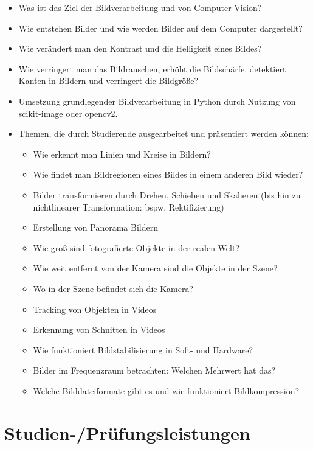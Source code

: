 \begin{itemize}
\tightlist
\item
  Was ist das Ziel der Bildverarbeitung und von Computer Vision?
\item
  Wie entstehen Bilder und wie werden Bilder auf dem Computer
  dargestellt?
\item
  Wie verändert man den Kontrast und die Helligkeit eines Bildes?
\item
  Wie verringert man das Bildrauschen, erhöht die Bildschärfe,
  detektiert Kanten in Bildern und verringert die Bildgröße?
\item
  Umsetzung grundlegender Bildverarbeitung in Python durch Nutzung von
  scikit-image oder opencv2.
\item
  Themen, die durch Studierende ausgearbeitet und präsentiert werden
  können:

  \begin{itemize}
\tightlist
\item
    Wie erkennt man Linien und Kreise in Bildern?
  \item
    Wie findet man Bildregionen eines Bildes in einem anderen Bild
    wieder?
  \item
    Bilder transformieren durch Drehen, Schieben und Skalieren (bis hin
    zu nichtlinearer Transformation: bspw. Rektifizierung)
  \item
    Erstellung von Panorama Bildern
  \item
    Wie groß sind fotografierte Objekte in der realen Welt?
  \item
    Wie weit entfernt von der Kamera sind die Objekte in der Szene?
  \item
    Wo in der Szene befindet sich die Kamera?
  \item
    Tracking von Objekten in Videos
  \item
    Erkennung von Schnitten in Videos
  \item
    Wie funktioniert Bildstabilisierung in Soft- und Hardware?
  \item
    Bilder im Frequenzraum betrachten: Welchen Mehrwert hat das?
  \item
    Welche Bilddateiformate gibt es und wie funktioniert
    Bildkompression?
  \end{itemize}
\end{itemize}

\hypertarget{studien-pruxfcfungsleistungenpathlabelmi-2017modulbeschreibungen-bachelorba_vc-bildverarbeitung-und-computer-vision}{%
\section*{Studien-/Prüfungsleistungen\label{/mi-2017/modulbeschreibungen-bachelor/BA_VC-bildverarbeitung-und-computer-vision}}\label{studien-pruxfcfungsleistungenpathlabelmi-2017modulbeschreibungen-bachelorba_vc-bildverarbeitung-und-computer-vision}}

